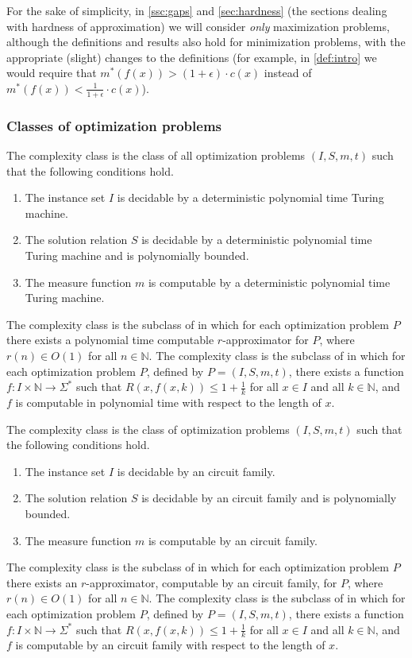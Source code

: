 \documentclass[]{article}
\begin{document}
For the sake of simplicity, in \autoref{ssc:gaps} and \autoref{sec:hardness} (the sections dealing with hardness of approximation) we will consider \emph{only} maximization problems, although the definitions and results also hold for minimization problems, with the appropriate (slight) changes to the definitions (for example, in \autoref{def:intro} we would require that $m^*(f(x)) > (1 + \epsilon) \cdot c(x)$ instead of $m^*(f(x)) < \frac{1}{1 + \epsilon} \cdot c(x)$).

\subsubsection{Classes of optimization problems}

The complexity class \NPO{} is the class of all optimization problems $(I, S, m, t)$ such that the following conditions hold.
\begin{enumerate}
\item The instance set $I$ is decidable by a deterministic polynomial time Turing machine.
\item The solution relation $S$ is decidable by a deterministic polynomial time Turing machine and is polynomially bounded.
\item The measure function $m$ is computable by a deterministic polynomial time Turing machine.
\end{enumerate}
The complexity class \APX{} is the subclass of \NPO{} in which for each optimization problem $P$ there exists a polynomial time computable $r$-approximator for $P$, where $r(n) \in O(1)$ for all $n \in \mathbb{N}$.
The complexity class \PTAS{} is the subclass of \APX{} in which for each optimization problem $P$, defined by $P = (I, S, m, t)$, there exists a function $f \colon I \times \mathbb{N} \to \Sigma^*$ such that $R(x, f(x, k)) \leq 1 + \frac{1}{k}$ for all $x \in I$ and all $k \in \mathbb{N}$, and $f$ is computable in polynomial time with respect to the length of $x$.

The complexity class \NNCO{} is the class of optimization problems $(I, S, m, t)$ such that the following conditions hold.
\begin{enumerate}
\item The instance set $I$ is decidable by an \NC{} circuit family.
\item The solution relation $S$ is decidable by an \NC{} circuit family and is polynomially bounded.
\item The measure function $m$ is computable by an \FNC{} circuit family.
\end{enumerate}
The complexity class \NCX{} is the subclass of \NNCO{} in which for each optimization problem $P$ there exists an $r$-approximator, computable by an \FNC{} circuit family, for $P$, where $r(n) \in O(1)$ for all $n \in \mathbb{N}$.
The complexity class \NCAS{} is the subclass of \NCX{} in which for each optimization problem $P$, defined by $P = (I, S, m, t)$, there exists a function $f \colon I \times \mathbb{N} \to \Sigma^*$ such that $R(x, f(x, k)) \leq 1 + \frac{1}{k}$ for all $x \in I$ and all $k \in \mathbb{N}$, and $f$ is computable by an \FNC{} circuit family with respect to the length of $x$.
\end{document}
